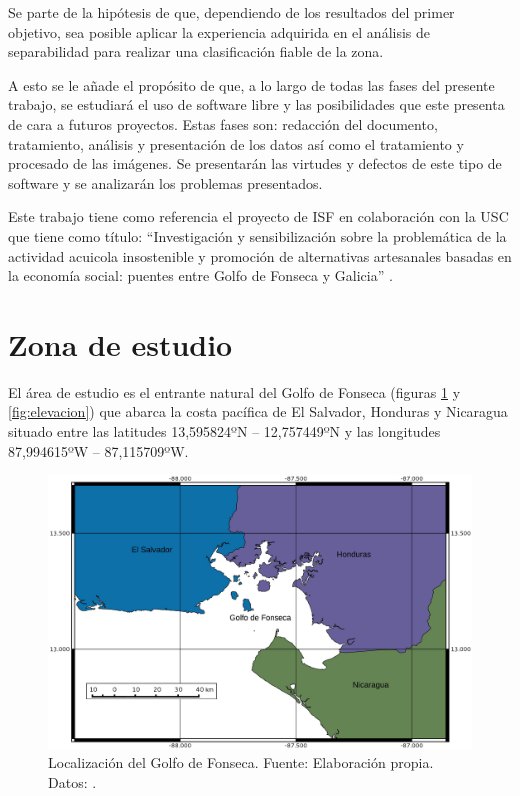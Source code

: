 Se parte de la hipótesis de que, dependiendo de los resultados del primer objetivo, sea posible aplicar la experiencia adquirida en el análisis de separabilidad para realizar una clasificación fiable de la zona.\Sep

A esto se le añade el propósito de que, a lo largo de todas las fases del presente trabajo, se estudiará el uso de software libre y las posibilidades que este presenta de cara a futuros proyectos. Estas fases son: redacción del documento, tratamiento, análisis y presentación de los datos así como el tratamiento y procesado de las imágenes. Se presentarán las virtudes y defectos de este tipo de software y se analizarán los problemas presentados.\Sep

Este trabajo tiene como referencia el proyecto de \ac{ISF} en colaboración con la \ac{USC} que tiene como título: ``Investigación y sensibilización sobre la problemática de la actividad acuicola insostenible y promoción de alternativas artesanales basadas en la economía social: puentes entre Golfo de Fonseca y Galicia'' \citep{laborate2014}.

\section{Zona de estudio}\label{sec:zonaestudio}
El área de estudio es el entrante natural del Golfo de Fonseca (figuras \ref{fig:localizacion} y \ref{fig:elevacion}) que abarca la costa pacífica de El Salvador, Honduras y Nicaragua situado entre las latitudes 13,595824ºN – 12,757449ºN y las longitudes 87,994615ºW – 87,115709ºW.\Sep

\begin{figure}
	\centering
	\includegraphics[width=0.8\linewidth]{./Imagenes/localizacion.eps}
	\caption[Localización del Golfo de Fonseca]{Localización del Golfo de Fonseca. Fuente: Elaboración propia. Datos: \cite{GADM2012}.}
	\label{fig:localizacion}
\end{figure}

